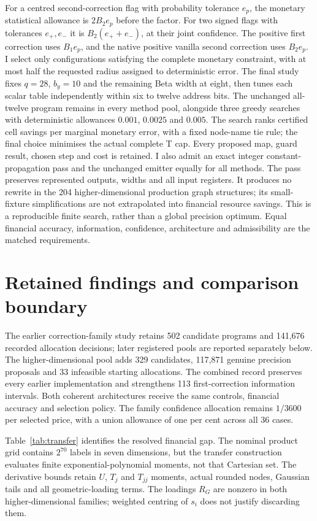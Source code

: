 \documentclass[11pt]{article}
\begin{document}
For a centred second-correction flag with probability tolerance $e_p$,
the monetary statistical allowance is $2B_2e_p$ before the factor.
For two signed flags with tolerances $e_+,e_-$ it is
$B_2(e_++e_-)$, at their joint confidence.
The positive first correction uses $B_1e_p$, and the native positive
vanilla second correction uses $B_2e_p$.
I select only configurations satisfying the complete monetary constraint,
with at most half the requested radius assigned to deterministic error.
The final study fixes $q=28$, $b_y=10$ and the remaining Beta width
at eight, then tunes each scalar table independently within six to twelve
address bits. The unchanged all-twelve program remains in every method
pool, alongside three greedy searches with deterministic allowances
$0.001$, $0.0025$ and $0.005$. The search ranks certified cell savings
per marginal monetary error, with a fixed node-name tie rule; the final
choice minimises the actual complete T cap. Every proposed map, guard
result, chosen step and cost is retained. I also admit an exact integer
constant-propagation pass and the unchanged emitter equally for all methods.
The pass preserves represented outputs, widths and all input registers.
It produces no rewrite in the 204 higher-dimensional production graph
structures; its small-fixture simplifications are not extrapolated into
financial resource savings. This is a reproducible finite
search, rather than a global precision optimum.  Equal financial accuracy, information, confidence,
architecture and admissibility are the matched requirements.

\section{Retained findings and comparison boundary}
\label{sec:results}

The earlier correction-family study retains 502 candidate programs and
141,676 recorded allocation decisions; later registered pools are reported
separately below. The higher-dimensional pool adds 329 candidates,
117,871 genuine precision proposals and 33 infeasible starting allocations.
The combined record preserves every earlier implementation and strengthens
113 first-correction information intervals. Both coherent architectures
receive the same controls, financial accuracy and selection policy.
The family confidence allocation remains $1/3600$ per selected price,
with a union allowance of one per cent across all 36 cases.

Table~\ref{tab:transfer} identifies the resolved financial gap. The nominal
product grid contains $2^{70}$ labels in seven dimensions, but the transfer
construction evaluates finite exponential-polynomial moments, not that
Cartesian set. The derivative bounds retain $U$, $T_j$ and $T_{jj}$
moments, actual rounded nodes, Gaussian tails and all geometric-loading
terms. The loadings $R_G$ are nonzero in both higher-dimensional families;
weighted centring of $s_i$ does not justify discarding them.
\end{document}
